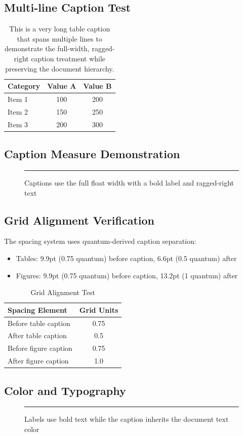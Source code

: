 \documentclass[11pt,a4paper]{article}
\begin{document}
\subsection{Multi-line Caption Test}

\begin{table}[tbp]
  \caption{This is a very long table caption that spans multiple lines to demonstrate the full-width, ragged-right caption treatment while preserving the document hierarchy.}
  \centering
  \begin{tabular}{@{}lcc@{}}
    \toprule
    Category & Value A & Value B \\
    \midrule
    Item 1 & 100 & 200 \\
    Item 2 & 150 & 250 \\
    Item 3 & 200 & 300 \\
    \bottomrule
  \end{tabular}
\end{table}

\subsection{Caption Measure Demonstration}

\lipsum[1]

\begin{figure}[tbp]
  \centering
  \rule{0.5\textwidth}{0.3\textwidth}
  \caption{Captions use the full float width with a bold label and ragged-right text}
  \label{fig:width-demo}
\end{figure}

\subsection{Grid Alignment Verification}

The spacing system uses quantum-derived caption separation:
\begin{itemize}
\item Tables: 9.9pt (0.75 quantum) before caption, 6.6pt (0.5 quantum) after
\item Figures: 9.9pt (0.75 quantum) before caption, 13.2pt (1 quantum) after
\end{itemize}

\begin{table}[tbp]
  \caption{Grid Alignment Test}
  \centering
  \begin{tabular}{@{}lc@{}}
    \toprule
    Spacing Element & Grid Units \\
    \midrule
    Before table caption & 0.75 \\
    After table caption & 0.5 \\
    Before figure caption & 0.75 \\
    After figure caption & 1.0 \\
    \bottomrule
  \end{tabular}
\end{table}

\subsection{Color and Typography}

\begin{figure}[tbp]
  \centering
  \rule{0.6\textwidth}{0.3\textwidth}
  \caption{Labels use bold text while the caption inherits the document text color}
\end{figure}
\end{document}
